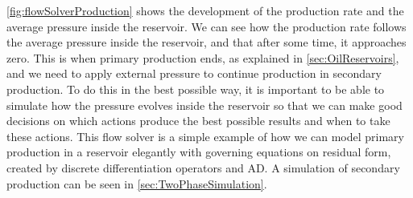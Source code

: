 \autoref{fig:flowSolverProduction} shows the development of the production rate and the average pressure inside the reservoir. We can see how the production rate follows the average pressure inside the reservoir, and that after some time, it approaches zero. This is when primary production ends, as explained in \autoref{sec:OilReservoirs}, and we need to apply external pressure to continue production in secondary production. To do this in the best possible way, it is important to be able to simulate how the pressure evolves inside the reservoir so that we can make good decisions on which actions produce the best possible results and when to take these actions. This flow solver is a simple example of how we can model primary production in a reservoir elegantly with governing equations on residual form, created by discrete differentiation operators and AD. A simulation of secondary production can be seen in \autoref{sec:TwoPhaseSimulation}.
